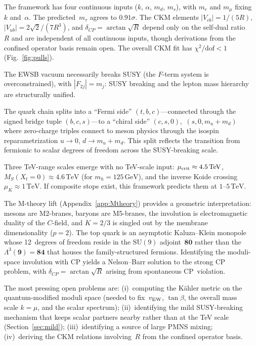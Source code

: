\documentclass[12pt,a4paper]{article}
\newcommand{\SU}{\mathrm{SU}}
\newcommand{\GeV}{\,\mathrm{GeV}}
\newcommand{\TeV}{\,\mathrm{TeV}}
\begin{document}
The framework has four continuous inputs ($k$, $\alpha$, $m_d$, $m_s$),
with $m_e$ and $m_\mu$ fixing $k$ and~$\alpha$.
The predicted~$m_\tau$ agrees to $0.91\sigma$.
The CKM elements $|V_{cb}| = 1/(5R)$, $|V_{ub}| = 2\sqrt{2}/(7R^3)$,
and $\delta_{CP} = \arctan\sqrt{R}$ depend only on the self-dual
ratio~$R$ and are independent of all continuous inputs, though
derivations from the confined operator basis remain open.
The overall CKM fit has $\chi^2/\text{dof} < 1$
(Fig.~\ref{fig:pulls}).

The EWSB vacuum necessarily breaks SUSY (the $F$-term system is
overconstrained), with $|F_{2j}| = m_j$: SUSY breaking and the
lepton mass hierarchy are structurally unified.

The quark chain splits into a ``Fermi side'' $(t,b,c)$---connected
through the signed bridge tuple $(b,c,s)$---to a ``chiral
side'' $(c,s,0)$,~$(s,0,m_u{+}m_d)$ where zero-charge triples
connect to meson physics through the isospin reparametrization
$u\to 0$, $d \to m_u{+}m_d$. This split reflects the
transition from fermionic to scalar degrees of freedom across the
SUSY-breaking scale.

Three TeV-range scales emerge with no TeV-scale input:
$\mu_{\rm crit} \approx 4.5\TeV$,
$M_S(X_t{=}0) \approx 4.6\TeV$ (for $m_h = 125\GeV$),
and the inverse Koide crossing $\mu_K \approx 1\TeV$.
If composite stops exist, this framework
predicts them at $1$--$5\TeV$.

The M-theory lift (Appendix~\ref{app:Mtheory}) provides a
geometric interpretation: mesons are M2-branes, baryons are
M5-branes, the involution is electromagnetic duality of the
$C$-field, and $K = 2/3$ is singled out by the membrane
dimensionality ($p = 2$).  The top quark is an asymptotic
Kaluza--Klein monopole whose 12~degrees of freedom reside in the
$\SU(9)$ adjoint~$\mathbf{80}$ rather than the
$\Lambda^3(\mathbf{9}) = \mathbf{84}$ that houses the
family-structured fermions.  Identifying the moduli-space involution
with CP yields a Nelson--Barr solution to the strong CP problem,
with $\delta_{CP} = \arctan\!\sqrt{R}$ arising from spontaneous
CP~violation.

The most pressing open problems are: (i)~computing the
K\"ahler metric on the quantum-modified moduli space (needed to
fix~$v_{\rm EW}$, $\tan\beta$, the overall mass scale $k = \mu$,
and the scalar spectrum);
(ii)~identifying the mild SUSY-breaking mechanism that keeps
scalar partners nearby rather than at the TeV scale
(Section~\ref{sec:mild});
(iii)~identifying a source of large PMNS mixing; (iv)~deriving
the CKM relations involving~$R$ from the confined operator basis.
\end{document}
